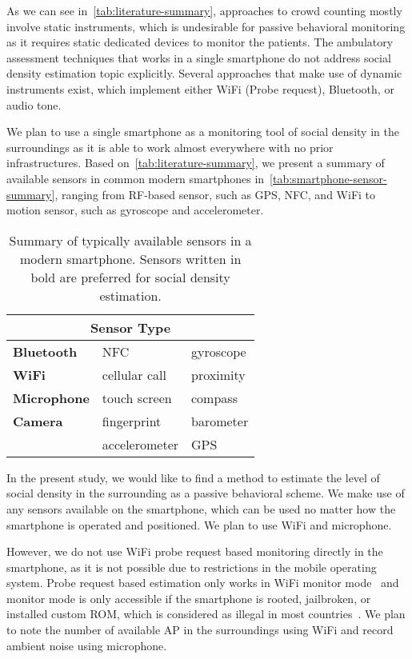 	As we can see in~\autoref{tab:literature-summary}, approaches to crowd counting mostly involve static instruments, which is undesirable for passive behavioral monitoring as it requires static dedicated devices to monitor the patients. The ambulatory assessment techniques that works in a single smartphone do not address social density estimation topic explicitly. Several approaches that make use of dynamic instruments exist, which implement either WiFi (Probe request), Bluetooth, or audio tone.

	We plan to use a single smartphone as a monitoring tool of social density in the surroundings as it is able to work almost everywhere with no prior infrastructures. Based on~\autoref{tab:literature-summary}, we present a summary of available sensors in common modern smartphones in~\autoref{tab:smartphone-sensor-summary}, ranging from \ac{RF}-based sensor, such as \ac{GPS}, \ac{NFC}, and WiFi to motion sensor, such as gyroscope and accelerometer.



\begin{table}[h]
\centering
\caption[Summary of typical smartphone sensors]
{Summary of typically available sensors in a modern smartphone. Sensors written in bold are preferred for social density estimation.}
\label{tab:smartphone-sensor-summary}
\begin{tabular}{lll}
\toprule
\multicolumn{3}{c}{Sensor Type} \\ \midrule
\textbf{Bluetooth}   & \ac{NFC}                    & gyroscope \\
\textbf{WiFi}        & cellular call               & proximity \\
\textbf{Microphone}  & touch screen                & compass \\
\textbf{Camera}      & fingerprint                 & barometer \\
                     & accelerometer               & \ac{GPS} \\
\bottomrule
\end{tabular}
\end{table}

In the present study, we would like to find a method to estimate the level of social density in the surrounding as a passive behavioral scheme. We make use of any sensors available on the smartphone, which can be used no matter how the smartphone is operated and positioned. We plan to use WiFi and microphone.

However, we do not use WiFi probe request based monitoring directly in the smartphone, as it is not possible due to restrictions in the mobile operating system. Probe request based estimation only works in WiFi monitor mode~\cite{thesis052,thesis079} and monitor mode is only accessible if the smartphone is rooted, jailbroken, or installed custom \ac{ROM}, which is considered as illegal in most countries~\cite{rootjailbreak}. We plan to note the number of available \ac{AP} in the surroundings using WiFi and record ambient noise using microphone.

